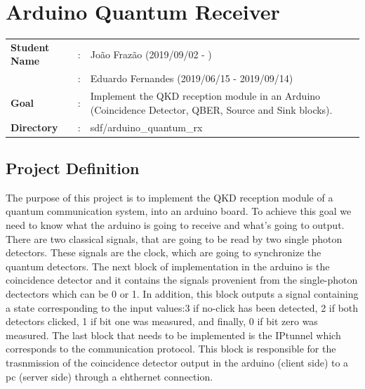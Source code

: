 \clearpage
\section{Arduino Quantum Receiver}

\begin{refsection}
	
	\begin{tcolorbox}	
		\begin{tabular}{p{2.75cm} p{0.2cm} p{10.5cm}} 	
			\textbf{Student Name}  		&:&  Jo\~ao Fraz\~ao (2019/09/02 - )\\
			&:&  Eduardo Fernandes (2019/06/15 - 2019/09/14)\\
			\textbf{Goal}          &:& Implement the QKD reception module in an Arduino (Coincidence Detector, QBER, Source and Sink blocks).\\
			\textbf{Directory}              &:& sdf/arduino\_quantum\_rx
		\end{tabular}
	\end{tcolorbox}
	
	
	\subsection{Project Definition}
	
		The purpose of this project is to implement the QKD reception module of a quantum communication system, into an arduino board. To achieve this goal we need to know what the arduino is going to receive and what's going to output.
		There are two classical signals, that are going to be read by two single photon detectors. These signals are the clock, which are going to synchronize the quantum detectors. The next block of implementation in the arduino is the coincidence detector and it contains the signals provenient from the single-photon dectectors which can be 0 or 1. In addition, this block outputs a signal containing a state corresponding to the input values:3 if no-click has been detected, 2 if both detectors clicked, 1 if bit one was measured, and finally, 0 if bit zero was measured. The last block that needs to be implemented is the IPtunnel which corresponds to the communication protocol. This block is responsible for the trasnmission of the coincidence detector output in the arduino (client side) to a pc (server side) through a ehthernet connection.
	

\end{refsection}
